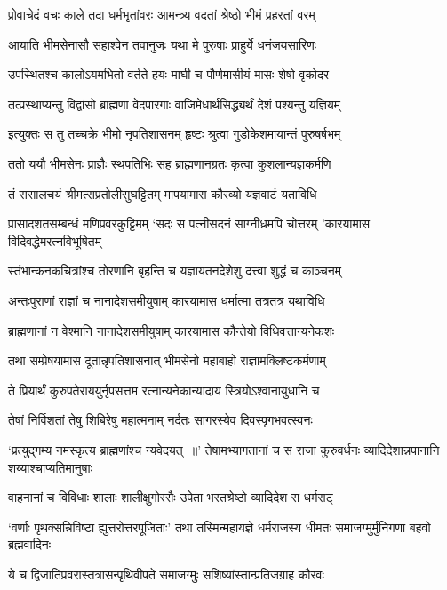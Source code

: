 \twolineshloka
{प्रोवाचेदं वचः काले तदा धर्मभृतांवरः}
{आमन्त्र्य वदतां श्रेष्ठो भीमं प्रहरतां वरम्}


\twolineshloka
{आयाति भीमसेनासौ सहाश्वेन तवानुजः}
{यथा मे पुरुषाः प्राहुर्ये धनंजयसारिणः}


\twolineshloka
{उपस्थितश्च कालोऽयमभितो वर्तते हयः}
{माघी च पौर्णमासीयं मासः शेषो वृकोदर}


\twolineshloka
{तत्प्रस्थाप्यन्तु विद्वांसो ब्राह्मणा वेदपारगाः}
{वाजिमेधार्थसिद्ध्यर्थं देशं पश्यन्तु यज्ञियम्}


\twolineshloka
{इत्युक्तः स तु तच्चक्रे भीमो नृपतिशासनम्}
{हृष्टः श्रुत्वा गुडोकेशमायान्तं पुरुषर्षभम्}


\twolineshloka
{ततो ययौ भीमसेनः प्राज्ञैः स्थपतिभिः सह}
{ब्राह्मणानग्रतः कृत्वा कुशलान्यज्ञकर्मणि}


\twolineshloka
{तं ससालचयं श्रीमत्सप्रतोलीसुघट्टितम्}
{मापयामास कौरव्यो यज्ञवाटं यताविधि}


\threelineshloka
{प्रासादशतसम्बन्धं मणिप्रवरकुट्टिमम्}
{`सदः स पत्नीसदनं साग्नीध्रमपि चोत्तरम्}
{'कारयामास विदिवद्धेमरत्नविभूषितम्}


\twolineshloka
{स्तंभान्कनकचित्रांश्च तोरणानि बृहन्ति च}
{यज्ञायतनदेशेशु दत्त्वा शुद्धं च काञ्चनम्}


\twolineshloka
{अन्तःपुराणां राज्ञां च नानादेशसमीयुषाम्}
{कारयामास धर्मात्मा तत्रतत्र यथाविधि}


\twolineshloka
{ब्राह्मणानां न वेश्मानि नानादेशसमीयुषाम्}
{कारयामास कौन्तेयो विधिवत्तान्यनेकशः}


\twolineshloka
{तथा सम्प्रेषयामास दूतान्नृपतिशासनात्}
{भीमसेनो महाबाहो राज्ञामक्लिष्टकर्मणाम्}


\twolineshloka
{ते प्रियार्थं कुरुपतेराययुर्नृपसत्तम}
{रत्नान्यनेकान्यादाय स्त्रियोऽश्वानायुधानि च}


\twolineshloka
{तेषां निर्विशतां तेषु शिबिरेषु महात्मनाम्}
{नर्दतः सागरस्येव दिवस्पृगभवत्स्वनः}


`प्रत्युद्गम्य नमस्कृत्य ब्राह्मणांश्च न्यवेदयत् ॥'
\twolineshloka
{तेषामभ्यागतानां च स राजा कुरुवर्धनः}
{व्यादिदेशान्नपानानि शय्याश्चाप्यतिमानुषाः}


\twolineshloka
{वाहनानां च विविधाः शालाः शालीक्षुगोरसैः}
{उपेता भरतश्रेष्ठो व्यादिदेश स धर्मराट्}


\threelineshloka
{`वर्णाः पृथक्सन्निविष्टा ह्युत्तरोत्तरपूजिताः'}
{तथा तस्मिन्महायज्ञे धर्मराजस्य धीमतः}
{समाजग्मुर्मुनिगणा बहवो ब्रह्मवादिनः}


\twolineshloka
{ये च द्विजातिप्रवरास्तत्रासन्पृथिवीपते}
{समाजग्मुः सशिष्यांस्तान्प्रतिजग्राह कौरवः}


